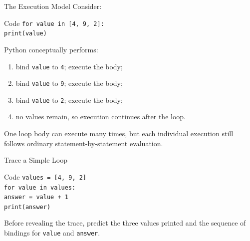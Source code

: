\documentclass[aspectratio=169,10pt]{beamer}
\begin{document}
\begin{frame}{The Execution Model}
  Consider:

  \begin{block}{Code}
    \texttt{for value in [4, 9, 2]:}\\
    \hspace{0.20in}\texttt{print(value)}
  \end{block}

  Python conceptually performs:
  \begin{enumerate}
    \item bind \texttt{value} to \texttt{4}; execute the body;
    \item bind \texttt{value} to \texttt{9}; execute the body;
    \item bind \texttt{value} to \texttt{2}; execute the body;
    \item no values remain, so execution continues after the loop.
  \end{enumerate}

  \begin{keyidea}
    One loop body can execute many times, but each individual execution still follows ordinary statement-by-statement evaluation.
  \end{keyidea}
\end{frame}

\begin{frame}{Trace a Simple Loop}
  \begin{block}{Code}
    \texttt{values = [4, 9, 2]}\\
    \texttt{for value in values:}\\
    \hspace{0.20in}\texttt{answer = value + 1}\\
    \hspace{0.20in}\texttt{print(answer)}
  \end{block}

  \begin{activity}
    Before revealing the trace, predict the three values printed and the sequence of bindings for \texttt{value} and \texttt{answer}.
  \end{activity}
\end{frame}
\end{document}
